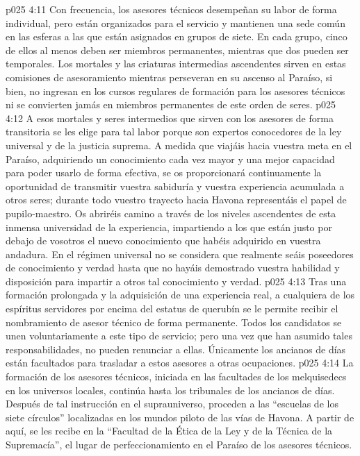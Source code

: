 \vs p025 4:11 Con frecuencia, los asesores técnicos desempeñan su labor de forma individual, pero están organizados para el servicio y mantienen una sede común en las esferas a las que están asignados en grupos de siete. En cada grupo, cinco de ellos al menos deben ser miembros permanentes, mientras que dos pueden ser temporales. Los mortales y las criaturas intermedias ascendentes sirven en estas comisiones de asesoramiento mientras perseveran en su ascenso al Paraíso, si bien, no ingresan en los cursos regulares de formación para los asesores técnicos ni se convierten jamás en miembros permanentes de este orden de seres.
\vs p025 4:12 A esos mortales y seres intermedios que sirven con los asesores de forma transitoria se les elige para tal labor porque son expertos conocedores de la ley universal y de la justicia suprema. A medida que viajáis hacia vuestra meta en el Paraíso, adquiriendo un conocimiento cada vez mayor y una mejor capacidad para poder usarlo de forma efectiva, se os proporcionará continuamente la oportunidad de transmitir vuestra sabiduría y vuestra experiencia acumulada a otros seres; durante todo vuestro trayecto hacia Havona representáis el papel de pupilo\hyp{}maestro. Os abriréis camino a través de los niveles ascendentes de esta inmensa universidad de la experiencia, impartiendo a los que están justo por debajo de vosotros el nuevo conocimiento que habéis adquirido en vuestra andadura. En el régimen universal no se considera que realmente seáis poseedores de conocimiento y verdad hasta que no hayáis demostrado vuestra habilidad y disposición para impartir a otros tal conocimiento y verdad.
\vs p025 4:13 Tras una formación prolongada y la adquisición de una experiencia real, a cualquiera de los espíritus servidores por encima del estatus de querubín se le permite recibir el nombramiento de asesor técnico de forma permanente. Todos los candidatos se unen voluntariamente a este tipo de servicio; pero una vez que han asumido tales responsabilidades, no pueden renunciar a ellas. Únicamente los ancianos de días están facultados para trasladar a estos asesores a otras ocupaciones.
\vs p025 4:14 \pc La formación de los asesores técnicos, iniciada en las facultades de los melquisedecs en los universos locales, continúa hasta los tribunales de los ancianos de días. Después de tal instrucción en el suprauniverso, proceden a las “escuelas de los siete círculos” localizadas en los mundos piloto de las vías de Havona. A partir de aquí, se les recibe en la “Facultad de la Ética de la Ley y de la Técnica de la Supremacía”, el lugar de perfeccionamiento en el Paraíso de los asesores técnicos.
